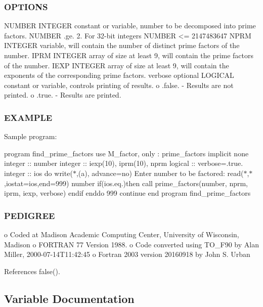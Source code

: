 \subsubsection*{O\+P\+T\+I\+O\+NS}

\begin{DoxyVerb}NUMBER   INTEGER constant or variable, number to be decomposed into
         prime factors. NUMBER .ge. 2.
         For 32-bit integers NUMBER <= 2147483647
NPRM     INTEGER variable, will contain the number of distinct prime
         factors of the number.
IPRM     INTEGER array of size at least 9, will contain the prime
         factors of the number.
IEXP     INTEGER array of size at least 9, will contain the
         exponents of the corresponding prime factors.
verbose  optional LOGICAL constant or variable, controls printing
         of results.
          o .false. - Results are not printed.
          o .true. - Results are printed.
\end{DoxyVerb}
 \subsubsection*{E\+X\+A\+M\+P\+LE}

Sample program\+:

program find\+\_\+prime\+\_\+factors use M\+\_\+factor, only \+: prime\+\_\+factors implicit none integer \+:\+: number integer \+:\+: iexp(10), iprm(10), nprm logical \+:\+: verbose=.true. integer \+:\+: ios do write($\ast$,\textquotesingle{}(a)\textquotesingle{}, advance=\textquotesingle{}no\textquotesingle{}) \textquotesingle{} Enter number to be factored\+: \textquotesingle{} read($\ast$,$\ast$,iostat=ios,end=999) number if(ios.\+eq.)then call prime\+\_\+factors(number, nprm, iprm, iexp, verbose) endif enddo 999 continue end program find\+\_\+prime\+\_\+factors

\subsubsection*{P\+E\+D\+I\+G\+R\+EE}

o Coded at Madison Academic Computing Center, University of Wisconsin, Madison o F\+O\+R\+T\+R\+AN 77 Version 1988. o Code converted using T\+O\+\_\+\+F90 by Alan Miller, 2000-\/07-\/14\+T11\+:42\+:45 o Fortran 2003 version 20160918 by John S. Urban 

References false().



\subsection{Variable Documentation}
\mbox{\label{namespacem__factor_a7ae228777d43741d83e3a4df917f39df}} 
